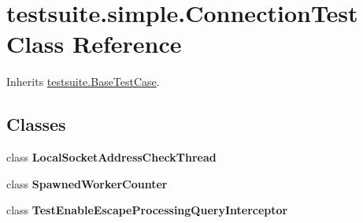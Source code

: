 \hypertarget{classtestsuite_1_1simple_1_1_connection_test}{}\section{testsuite.\+simple.\+Connection\+Test Class Reference}
\label{classtestsuite_1_1simple_1_1_connection_test}


Inherits \mbox{\hyperlink{classtestsuite_1_1_base_test_case}{testsuite.\+Base\+Test\+Case}}.

\subsection*{Classes}
\begin{DoxyCompactItemize}
\item 
class {\bfseries Local\+Socket\+Address\+Check\+Thread}
\item 
class {\bfseries Spawned\+Worker\+Counter}
\item 
class {\bfseries Test\+Enable\+Escape\+Processing\+Query\+Interceptor}
\end{DoxyCompactItemize}
